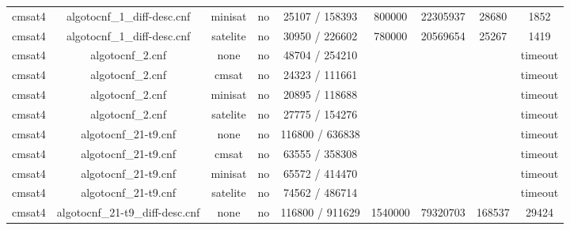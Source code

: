 \begin{appendices}
{\begin{table}[p]
\begin{center}
\begin{tabular}{l|cccccccc}
  cmsat4                         & algotocnf\_1\_diff-desc.cnf    & minisat    & no    & 25107 / 158393 & 800000    & 22305937  & 28680      & 1852 \\ %
  cmsat4                         & algotocnf\_1\_diff-desc.cnf    & satelite   & no    & 30950 / 226602 & 780000    & 20569654  & 25267      & 1419 \\ %
  cmsat4                         & algotocnf\_2.cnf               & none       & no    & 48704 / 254210 &           &           &            & timeout \\ %
  cmsat4                         & algotocnf\_2.cnf               & cmsat      & no    & 24323 / 111661 &           &           &            & timeout \\ %
  cmsat4                         & algotocnf\_2.cnf               & minisat    & no    & 20895 / 118688 &           &           &            & timeout \\ %
  cmsat4                         & algotocnf\_2.cnf               & satelite   & no    & 27775 / 154276 &           &           &            & timeout \\ %
  cmsat4                         & algotocnf\_21-t9.cnf           & none       & no    & 116800 / 636838 &           &           &            & timeout \\ %
  cmsat4                         & algotocnf\_21-t9.cnf           & cmsat      & no    & 63555 / 358308 &           &           &            & timeout \\ %
  cmsat4                         & algotocnf\_21-t9.cnf           & minisat    & no    & 65572 / 414470 &           &           &            & timeout \\ %
  cmsat4                         & algotocnf\_21-t9.cnf           & satelite   & no    & 74562 / 486714 &           &           &            & timeout \\ %
  cmsat4                         & algotocnf\_21-t9\_diff-desc.cnf & none       & no    & 116800 / 911629 & 1540000   & 79320703  & 168537     & 29424 \\ %

\end{tabular}
\end{center}
\end{table}}
\end{appendices}
